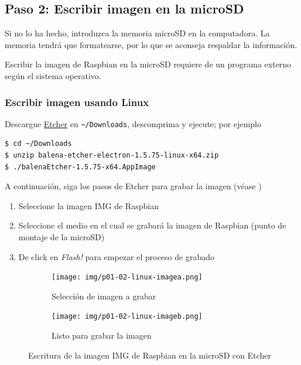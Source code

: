 \documentclass[letterpaper,10.5pt]{article}
\begin{document}
%
%
\subsection{Paso 2: Escribir imagen en la microSD}%
\label{sec:step2}
Si no lo ha hecho, introduzca la memoria microSD en la computadora.
La memoria tendrá que formatearse, por lo que se aconseja respaldar la información.

Escribir la imagen de Raspbian en la microSD requiere de un programa externo según el sistema operativo.

%
%
\subsubsection{Escribir imagen usando Linux}%
Descargue \href{https://etcher.io/}{Etcher} en \texttt{\textasciitilde/Downloads}, descomprima y ejecute; por ejemplo

\begin{Verbatim}[fontsize=\footnotesize]
$ cd ~/Downloads
$ unzip balena-etcher-electron-1.5.75-linux-x64.zip
$ ./balenaEtcher-1.5.75-x64.AppImage
\end{Verbatim}


A continuación, siga los pasos de Etcher para grabar la imagen (véase )
\begin{enumerate}[noitemsep]
	\item Seleccione la imagen IMG de Raspbian
	\item Seleccione el medio en el cual se grabará la imagen de Raspbian (punto de montaje de la microSD)
	\item De click en \emph{Flash!} para empezar el proceso de grabado
\end{enumerate}

\begin{figure}[H]
	\centering%
	\begin{subfigure}[b]{0.5\linewidth}
		\centering
		\texttt{[image: img/p01-02-linux-imagea.png]} %
		\caption{Selección de imagen a grabar}
		\label{fig:write-image-linux-a} %
	\end{subfigure}%
	\begin{subfigure}[b]{0.5\linewidth}
		\centering
		\texttt{[image: img/p01-02-linux-imageb.png]} %
		\caption{Listo para grabar la imagen}
		\label{fig:write-image-linux-b} %
	\end{subfigure}
	\caption{Escritura de la imagen IMG de Raspbian en la microSD con Etcher}%
	\label{fig:write-image-linux} %
\end{figure}
\end{document}
